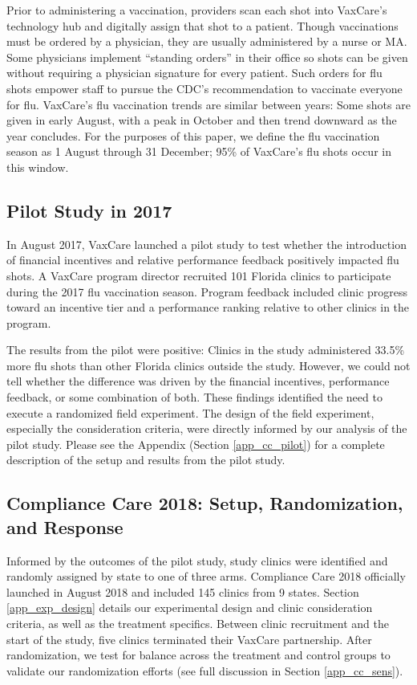  Prior to administering a vaccination, providers scan each shot into VaxCare’s technology hub and digitally assign that shot to a patient. Though vaccinations must be ordered by a physician, they are usually administered by a nurse or MA. Some physicians implement “standing orders” in their office so shots can be given without requiring a physician signature for every patient. Such orders for flu shots empower staff to pursue the CDC’s recommendation to vaccinate everyone for flu. VaxCare’s flu vaccination trends are similar between years: Some shots are given in early August, with a peak in October and then trend downward as the year concludes. For the purposes of this paper, we define the flu vaccination season as 1 August through 31 December; 95\% of VaxCare’s flu shots occur in this window. 

 \subsection{Pilot Study in 2017}
 In August 2017, VaxCare launched a pilot study to test whether the introduction of financial incentives and relative performance feedback positively impacted flu shots. A VaxCare program director recruited 101 Florida clinics to participate during the 2017 flu vaccination season. Program feedback included clinic progress toward an incentive tier and a performance ranking relative to other clinics in the program.
 
 The results from the pilot were positive: Clinics in the study administered 33.5\% more flu shots than other Florida clinics outside the study. However, we could not tell whether the difference was driven by the financial incentives, performance feedback, or some combination of both. These findings identified the need to execute a randomized field experiment. The design of the field experiment, especially the consideration criteria, were directly informed by our analysis of the pilot study. Please see the Appendix (Section \ref{app_cc_pilot}) for a complete description of the setup and results from the pilot study.

 \subsection{Compliance Care 2018: Setup, Randomization, and Response} \label{cc_setup}
 Informed by the outcomes of the pilot study, study clinics were identified and randomly assigned by state to one of three arms. Compliance Care 2018 officially launched in August 2018 and included 145 clinics from 9 states. Section \ref{app_exp_design} details our experimental design and clinic consideration criteria, as well as the treatment specifics. Between clinic recruitment and the start of the study, five clinics terminated their VaxCare partnership. After randomization, we test for balance across the treatment and control groups to validate our randomization efforts (see full discussion in Section \ref{app_cc_sens}).
 
